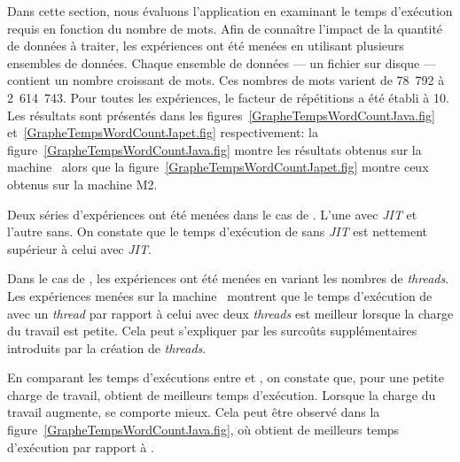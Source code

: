 

Dans cette section, nous 
\'evaluons l'application  en examinant le temps d'ex\'ecution requis en fonction du nombre de mots. Afin de conna\^itre l'impact de la quantit\'e de donn\'ees \`a traiter, les exp\'eriences ont \'et\'e men\'ees en utilisant plusieurs ensembles de donn\'ees. Chaque ensemble de donn\'ees --- un fichier sur disque --- contient un nombre croissant de mots. Ces nombres de mots varient de 78~792 \`a 2~614~743. Pour toutes les exp\'eriences, le facteur de r\'ep\'etitions a \'et\'e \'etabli \`a 10.  Les r\'esultats sont pr\'esent\'es dans les figures~\ref{GrapheTempsWordCountJava.fig} et~\ref{GrapheTempsWordCountJapet.fig} respectivement: la figure~\ref{GrapheTempsWordCountJava.fig} montre les résultats obtenus sur la machine \ alors que la figure~\ref{GrapheTempsWordCountJapet.fig} montre ceux obtenus sur la machine M2.




Deux s\'eries d'exp\'eriences ont \'et\'e men\'ees dans le cas de . L'une avec \emph{JIT} et l'autre sans. On constate que le temps d'ex\'ecution de  sans \emph{JIT} est nettement sup\'erieur \`a celui avec \emph{JIT}.

Dans le cas de , les exp\'eriences ont \'et\'e men\'ees en variant les nombres de \emph{threads}. Les exp\'eriences men\'ees sur la machine \ montrent que le temps d'ex\'ecution de  avec un \emph{thread} par rapport \`a celui avec deux \emph{threads} est meilleur lorsque la charge du travail est petite. Cela peut s'expliquer par les surco\^uts suppl\'ementaires introduits par la cr\'eation de \emph{threads}. 

En comparant les temps d'ex\'ecutions entre  et , on constate que, pour une petite charge de travail,  obtient de meilleurs temps d'ex\'ecution. Lorsque la charge du travail augmente,  se comporte mieux. Cela peut \^etre observ\'e dans la figure~\ref{GrapheTempsWordCountJava.fig}, o\`u  obtient de meilleurs temps d'ex\'ecution par rapport \`a . 

